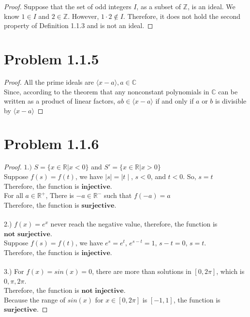 \documentclass[12pt]{article}
\begin{document}
\begin{proof}
	Suppose that the set of odd integers $I$, as a subset of $\mathbb{Z}$, is an ideal. We know $1 \in I$ and $2 \in \mathbb{Z}$. However, $1 \cdot 2 \notin I$. Therefore, it does not hold the second property of Definition 1.1.3 and is not an ideal.
\end{proof}

\newpage 

\section{Problem 1.1.5}

\begin{proof}
	All the prime ideals are $\langle x-a \rangle, a \in \mathbb{C}$
 \\ Since, according to the theorem that any nonconstant polynomials in $\mathbb{C}$ can be written as a product of linear factors, $ab \in \langle x-a \rangle$ if and only if $a$ or $b$ is divisible by $\langle x-a \rangle$
\end{proof}

\newpage 

\section{Problem 1.1.6}

\begin{proof}
	$1.)$ $S=\{x\in\mathbb{R}|x<0\}$ and $S'=\{x\in\mathbb{R}|x>0\}$
    \\Suppose $f(s)=f(t)$, we have $\mid s \mid= \mid t \mid$, $s<0$, and $t<0$. So, $s=t$
    \\Therefore, the function is $\textbf{injective}$.
    \\For all $a \in \mathbb{R^+}$, There is $-a \in \mathbb{R^-}$ such that $f(-a)=a$
    \\Therefore, the function is $\textbf{surjective}$.
    \\ \\ 2.)
    $f(x)=e^x$ never reach the negative value, therefore, the function is $\textbf{not surjective}$.
    \\Suppose $f(s)=f(t)$, we have $e^s=e^t$, $e^{s-t}=1$, $s-t=0$, $s=t$.
    \\Therefore, the function is $\textbf{injective}$.
    \\ \\ 3.)
    For $f(x)=sin(x)=0$, there are more than solutions in $[0,2\pi]$, which is $0, \pi, 2\pi$.
    \\Therefore, the function is $\textbf{not injective}$.
    \\Because the range of $sin(x)$ for $x\in[0,2 \pi]$ is $[-1,1]$,  the function is $\textbf{surjective}$.
\end{proof}
\end{document}

